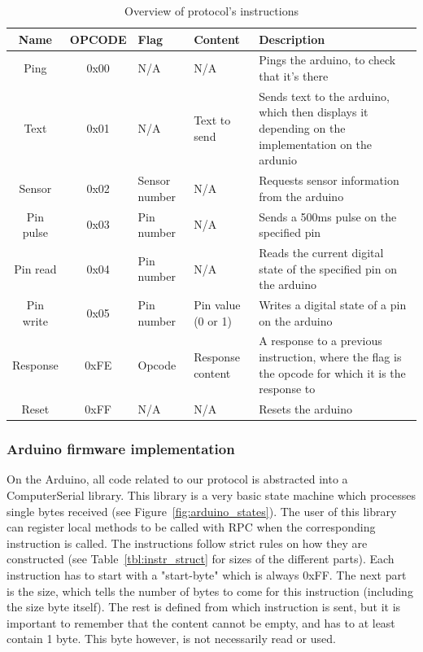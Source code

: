 \begin{table}[h!]
	\begin{tabular}{ | c | c | p{1.5cm} | p{1.7cm} | p{6cm} |}
		\hline
		\textbf{Name} & \textbf{OPCODE} & \textbf{Flag} & \textbf{Content} & \textbf{Description} \\
		\hline
		Ping & 0x00 & N/A & N/A & Pings the arduino, to check that it's there \\
		\hline
		Text & 0x01 & N/A & Text to send & Sends text to the arduino, which then displays it depending on the implementation on the ardunio \\
		\hline
		Sensor & 0x02 & Sensor number & N/A & Requests sensor information from the arduino \\
		\hline
		Pin pulse & 0x03 & Pin number & N/A & Sends a 500ms pulse on the specified pin \\
		\hline
		Pin read & 0x04 & Pin number & N/A & Reads the current digital state of the specified pin on the arduino \\
		\hline
		Pin write & 0x05 & Pin number & Pin value (0 or 1) & Writes a digital state of a pin on the arduino \\
		\hline
		Response & 0xFE & Opcode & Response content & A response to a previous instruction, where the flag is the opcode for which it is the response to \\
		\hline
		Reset & 0xFF & N/A & N/A & Resets the arduino \\
		\hline
	\end{tabular}
	\caption{Overview of protocol's instructions}
	\label{tbl:opcodes}
\end{table}

\subsubsection{Arduino firmware implementation}
On the Arduino, all code related to our protocol is abstracted into a ComputerSerial library.
This library is a very basic state machine which processes single bytes received (see Figure~\ref{fig:arduino_states}).
The user of this library can register local methods to be called with RPC when the corresponding instruction is called.
The instructions follow strict rules on how they are constructed (see Table~\ref{tbl:instr_struct} for sizes of the different parts).
Each instruction has to start with a "start-byte" which is always 0xFF. The next part is the size, which tells the number of bytes
to come for this instruction (including the size byte itself). The rest is defined from which instruction is sent, but it is important to
remember that the content cannot be empty, and has to at least contain 1 byte. This byte however, is not necessarily read or used.

